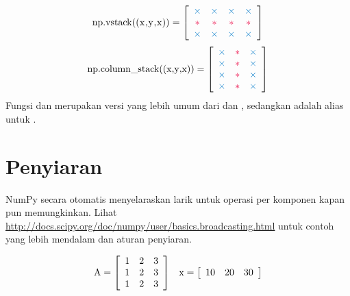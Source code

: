 \begin{align*}
\text{\li{np.vstack((x,y,x))}} =
\left[\begin{array}{cccc}
\textcolor{blue}{\times}&\textcolor{blue}{\times}&\textcolor{blue}{\times}&\textcolor{blue}{\times}\\
\textcolor{red}{*}&\textcolor{red}{*}&\textcolor{red}{*}&\textcolor{red}{*}\\
\textcolor{blue}{\times}&\textcolor{blue}{\times}&\textcolor{blue}{\times}&\textcolor{blue}{\times}
\end{array}\right]
\end{align*}
\begin{align*}
\text{\li{np.column_stack((x,y,x))}} =
\left[\begin{array}{ccc}
\textcolor{blue}{\times}&\textcolor{red}{*}&\textcolor{blue}{\times}\\
\textcolor{blue}{\times}&\textcolor{red}{*}&\textcolor{blue}{\times}\\
\textcolor{blue}{\times}&\textcolor{red}{*}&\textcolor{blue}{\times}\\
\textcolor{blue}{\times}&\textcolor{red}{*}&\textcolor{blue}{\times}
\end{array}\right]
\end{align*}
Fungsi  dan  merupakan versi yang lebih umum dari  dan , sedangkan  adalah alias untuk .

\section*{Penyiaran} %

NumPy secara otomatis menyelaraskan larik untuk operasi per komponen kapan pun memungkinkan.
Lihat \url{http://docs.scipy.org/doc/numpy/user/basics.broadcasting.html} untuk contoh yang lebih mendalam dan aturan penyiaran.

\begin{align*}
\text{\li{A}} = \left[\begin{array}{ccc}
1 & 2 & 3\\
1 & 2 & 3\\
1 & 2 & 3\\
\end{array}\right]
&&
\text{\li{x}} = \left[\begin{array}{ccc}
10 & 20 & 30
\end{array}\right]
\end{align*}

